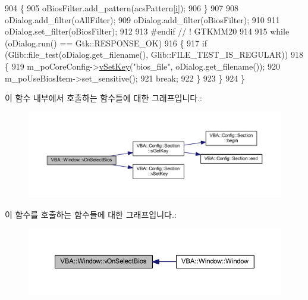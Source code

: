 \begin{DoxyCode}
904   \{
905     oBiosFilter.add\_pattern(acsPattern[\mbox{\hyperlink{expr-lex_8cpp_acb559820d9ca11295b4500f179ef6392}{i}}]);
906   \}
907 
908   oDialog.add\_filter(oAllFilter);
909   oDialog.add\_filter(oBiosFilter);
910 
911   oDialog.set\_filter(oBiosFilter);
912 
913 \textcolor{preprocessor}{#endif // ! GTKMM20}
914 
915   \textcolor{keywordflow}{while} (oDialog.run() == Gtk::RESPONSE\_OK)
916   \{
917     \textcolor{keywordflow}{if} (Glib::file\_test(oDialog.get\_filename(), Glib::FILE\_TEST\_IS\_REGULAR))
918     \{
919       m\_poCoreConfig->\mbox{\hyperlink{class_v_b_a_1_1_config_1_1_section_a57e1b95cbea40db71c093381beff4b0e}{vSetKey}}(\textcolor{stringliteral}{"bios\_file"}, oDialog.get\_filename());
920       m\_poUseBiosItem->set\_sensitive();
921       \textcolor{keywordflow}{break};
922     \}
923   \}
924 \}
\end{DoxyCode}
이 함수 내부에서 호출하는 함수들에 대한 그래프입니다.\+:
\nopagebreak
\begin{figure}[H]
\begin{center}
\leavevmode
\includegraphics[width=350pt]{class_v_b_a_1_1_window_a5d20c67c2118e4a18e97cab4ba111c65_cgraph}
\end{center}
\end{figure}
이 함수를 호출하는 함수들에 대한 그래프입니다.\+:
\nopagebreak
\begin{figure}[H]
\begin{center}
\leavevmode
\includegraphics[width=350pt]{class_v_b_a_1_1_window_a5d20c67c2118e4a18e97cab4ba111c65_icgraph}
\end{center}
\end{figure}
\mbox{\label{class_v_b_a_1_1_window_a81a46aa6f68c512ed86aa04ca13dbd71}} 
